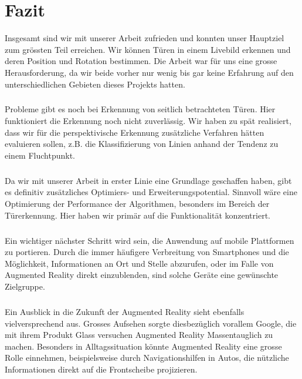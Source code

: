 \chapter{Fazit}

Insgesamt sind wir mit unserer Arbeit zufrieden und konnten unser Hauptziel zum grössten Teil erreichen. Wir können Türen in einem Livebild erkennen und deren Position und Rotation bestimmen. Die Arbeit war für uns eine grosse Herausforderung, da wir beide vorher nur wenig bis gar keine Erfahrung auf den unterschiedlichen Gebieten dieses Projekts hatten.
\paragraph{}
Probleme gibt es noch bei Erkennung von seitlich betrachteten Türen. Hier funktioniert die Erkennung noch nicht zuverlässig. Wir haben zu spät realisiert, dass wir für die perspektivische Erkennung zusätzliche Verfahren hätten evaluieren sollen, z.B. die Klassifizierung von Linien anhand der Tendenz zu einem Fluchtpunkt.

\paragraph{}
Da wir mit unserer Arbeit in erster Linie eine Grundlage geschaffen haben, gibt es definitiv zusätzliches Optimiers- und Erweiterungspotential. Sinnvoll wäre eine Optimierung der Performance der Algorithmen, besonders im Bereich der Türerkennung. Hier haben wir primär auf die Funktionalität konzentriert. 
\paragraph{}
Ein wichtiger nächster Schritt wird sein, die Anwendung auf mobile Plattformen zu portieren. Durch die immer häufigere Verbreitung von Smartphones und die Möglichkeit, Informationen an Ort und Stelle abzurufen, oder im Falle von Augmented Reality direkt einzublenden, sind solche Geräte eine gewünschte Zielgruppe. 
\paragraph{}
Ein Ausblick in die Zukunft der Augmented Reality sieht ebenfalls vielversprechend aus. Grosses Aufsehen sorgte diesbezüglich vorallem Google, die mit ihrem Produkt Glass versuchen Augmented Reality Massentauglich zu machen. Besonders in Alltagssituation könnte Augmented Reality eine grosse Rolle einnehmen, beispielsweise durch Navigationshilfen in Autos, die nützliche Informationen direkt auf die Frontscheibe projizieren.
